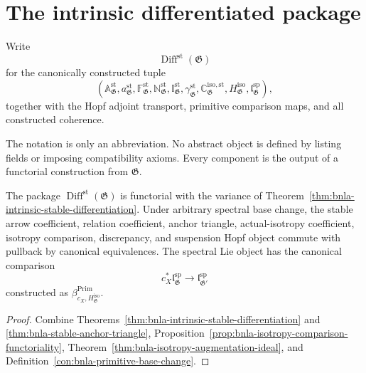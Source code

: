 \section{The intrinsic differentiated package}
\label{sec:bnla-intrinsic-package}

\begin{definition}
\label{def:bnla-intrinsic-package}
Write
\[
    \operatorname{Diff}^{\mathrm{st}}(\mathfrak G)
\]
for the canonically constructed tuple
\[
\left(
\mathbb A^{\mathrm{st}}_{\mathfrak G},
 a^{\mathrm{st}}_{\mathfrak G},
\mathbb F^{\mathrm{st}}_{\mathfrak G},
\mathbb N^{\mathrm{st}}_{\mathfrak G},
\mathbb I^{\mathrm{st}}_{\mathfrak G},
\gamma^{\mathrm{st}}_{\mathfrak G},
\mathbb C^{\mathrm{iso,st}}_{\mathfrak G},
H^{\mathrm{iso}}_{\mathfrak G},
\mathfrak l^{\mathrm{sp}}_{\mathfrak G}
\right),
\]
together with the Hopf adjoint transport, primitive comparison maps, and all
constructed coherence.
\end{definition}

\begin{remark}
The notation is only an abbreviation.  No abstract object is defined by
listing fields or imposing compatibility axioms.  Every component is the
output of a functorial construction from $\mathfrak G$.
\end{remark}

\begin{theorem}
\label{thm:bnla-intrinsic-package}
The package $\operatorname{Diff}^{\mathrm{st}}(\mathfrak G)$ is functorial
with the variance of
Theorem~\ref{thm:bnla-intrinsic-stable-differentiation}.  Under arbitrary
spectral base change, the stable arrow coefficient, relation coefficient,
anchor triangle, actual-isotropy coefficient, isotropy comparison,
discrepancy, and suspension Hopf object commute with pullback by canonical
equivalences.  The spectral Lie object has the canonical comparison
\[
    c_X^*\mathfrak l^{\mathrm{sp}}_{\mathfrak G}
    \longrightarrow
    \mathfrak l^{\mathrm{sp}}_{\mathfrak G'}
\]
constructed as $\beta^{\mathrm{Prim}}_{c_X,H^{\mathrm{iso}}_{\mathfrak G}}$.
\end{theorem}

\begin{proof}
Combine Theorems~\ref{thm:bnla-intrinsic-stable-differentiation} and
\ref{thm:bnla-stable-anchor-triangle},
Proposition~\ref{prop:bnla-isotropy-comparison-functoriality},
Theorem~\ref{thm:bnla-isotropy-augmentation-ideal}, and
Definition~\ref{con:bnla-primitive-base-change}.
\end{proof}

